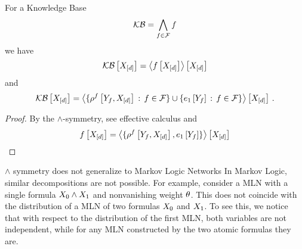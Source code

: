 \begin{theorem}\label{the:conDecKB}
	For a Knowledge Base
		\[ \mathcal{KB} = \bigwedge_{f\in\mathcal{F}} f \]
	we have
		\[ \mathcal{KB}\left[X_{[d]}\right] = \left\langle f\left[X_{[d]}\right]\right\rangle \left[ X_{[d]} \right]   \]
	and
		\[ \mathcal{KB}\left[X_{[d]}\right] = \left\langle \{\rho^{f}\left[Y_{f},X_{[d]}\right] \, : \, f\in\mathcal{F}\} \cup \{e_1\left[Y_{f}\right] \, : \, f\in\mathcal{F}\} \right\rangle \left[ X_{[d]} \right] \, .  \]
\end{theorem}
\begin{proof}
	By the $\land$-symmetry, see effective calculus and 
		\[ f\left[X_{[d]}\right] =  \left\langle \{\rho^{f}\left[Y_{f},X_{[d]}\right],e_1\left[Y_{f}\right]\}\right\rangle \left[ X_{[d]} \right] \]
\end{proof}

\begin{remark}{$\land$ symmetry does not generalize to Markov Logic Networks}
	In Markov Logic, similar decompositions are not possible.
	For example, consider a MLN with a single formula $X_{0}\land X_{1}$ and nonvanishing weight $\theta$.
	This does not coincide with the distribution of a MLN of two formulas $X_{0}$ and $X_{1}$.
	To see this, we notice that with respect to the distribution of the first MLN, both variables are not independent, while for any MLN constructed by the two atomic formulas they are.
\end{remark}


%
%
%
%


